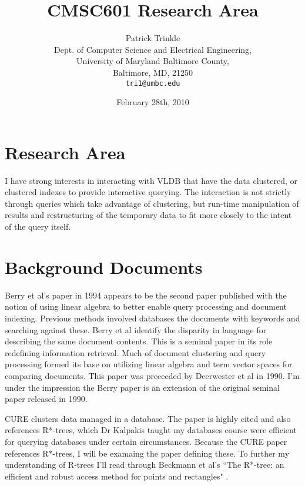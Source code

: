 \documentclass[11pt]{article}
\title{CMSC601 Research Area}
\author{Patrick Trinkle\\
Dept. of Computer Science and Electrical Engineering,\\
University of Maryland Baltimore County,\\
Baltimore, MD, 21250\\
\texttt{tri1@umbc.edu}}
\date{February 28th, 2010}
\begin{document}
\maketitle

\section{Research Area}

I have strong interests in interacting with VLDB that have the data clustered, or clustered indexes to provide interactive querying.  The interaction is not strictly through queries which take advantage of clustering, but run-time manipulation of results and restructuring of the temporary data to fit more closely to the intent of the query itself.

\section{Background Documents}

Berry et al's paper in 1994 \cite{berry94} appears to be the second paper published with the notion of using linear algebra to better enable query processing and document indexing.  Previous methods involved databases the documents with keywords and searching against these.  Berry et al identify the disparity in language for describing the same document contents.  This is a seminal paper in its role redefining information retrieval.  Much of document
clustering and query processing formed its base on utilizing linear algebra and term vector spaces for comparing documents.  This paper was preceeded by Deerwester et al \cite{deerwester90} in 1990.  I'm under the impression the Berry paper is an extension of the original seminal paper released in 1990.

CURE \cite{guha98} clusters data managed in a database.  The paper is highly cited and also references R*-trees, which Dr Kalpakis taught my databases course were efficient for querying databases under certain circumstances.  Because the CURE paper references R*-trees, I will be examaing the paper defining these.  To further my understanding of R-trees I'll read through Beckmann et al's ``The R*-tree: an efficient and robust access method for points and rectangles" \cite{beckmann90}.



\end{document}
